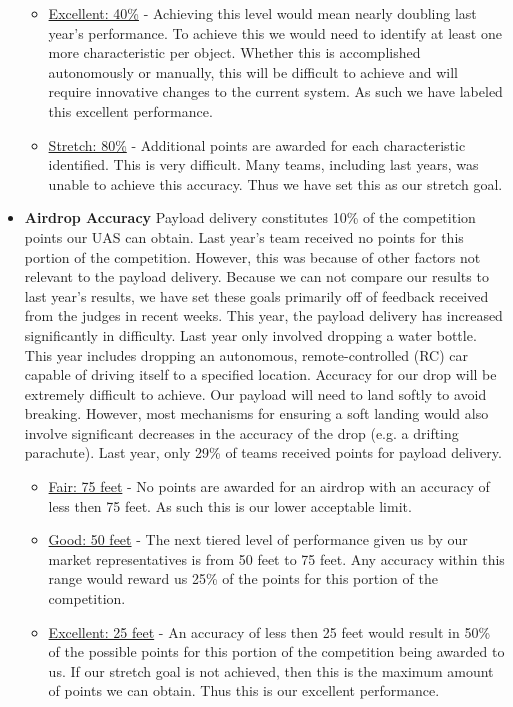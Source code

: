 \documentclass[]{auvsi_doc}
\begin{document}
\begin{itemize}
\begin{itemize}
	\item \underline{Excellent: 40\%} - Achieving this level would mean nearly doubling last year's performance. To achieve this we would need to identify at least one more characteristic per object. Whether this is accomplished autonomously or manually, this will be difficult to achieve and will require innovative changes to the current system. As such we have labeled this excellent performance.
	\item \underline{Stretch: 80\%} - Additional points are awarded for each characteristic identified. This is very difficult. Many teams, including last years, was unable to achieve this accuracy. Thus we have set this as our stretch goal.
	\end{itemize}
\item \textbf{Airdrop Accuracy} Payload delivery constitutes 10\% of the competition points our UAS can obtain. Last year's team received no points for this portion of the competition. However, this was because of other factors not relevant to the payload delivery. Because we can not compare our results to last year's results, we have set these goals primarily off of feedback received from the judges in recent weeks. This year, the payload delivery has increased significantly in difficulty. Last year only involved dropping a water bottle. This year includes dropping an autonomous, remote-controlled (RC) car capable of driving itself to a specified location. Accuracy for our drop will be extremely difficult to achieve. Our payload will need to land softly to avoid breaking. However, most mechanisms for ensuring a soft landing would also involve significant decreases in the accuracy of the drop (e.g. a drifting parachute). Last year, only 29\% of teams received points for payload delivery. 
	\begin{itemize}
	\item  \underline{Fair: 75 feet} -  No points are awarded for an airdrop with an accuracy of less then 75 feet. As such this is our lower acceptable limit.
	\item \underline{Good: 50 feet} -  The next tiered level of performance given us by our market representatives is from 50 feet to 75 feet. Any accuracy within this range would reward us 25\% of the points for this portion of the competition.
	\item \underline{Excellent: 25 feet} -  An accuracy of less then 25 feet would result in 50\% of the possible points for this portion of the competition being awarded to us. If our stretch goal is not achieved, then this is the maximum amount of points we can obtain. Thus this is our excellent performance.

\end{itemize}
\end{itemize}
\end{document}
